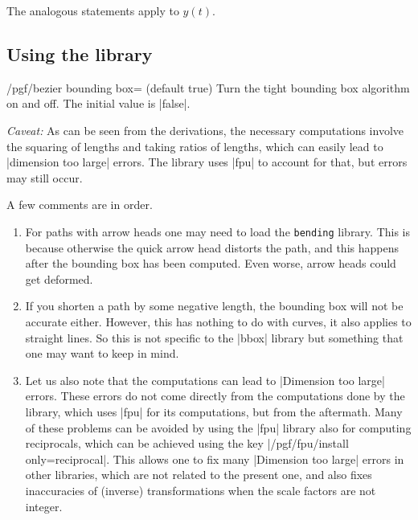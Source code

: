 The analogous statements apply to $y(t)$. 

\subsection{Using the library}

\begin{key}{/pgf/bezier bounding box= (default true)}
    Turn the tight bounding box algorithm on and off. The initial value is
	|false|.

	\emph{Caveat:} As can be seen from the derivations, the necessary
	computations involve the squaring of lengths and taking ratios of lengths,
	which can easily lead to |dimension too large| errors. The library uses
	|fpu| to account for that, but errors may still occur.
\end{key}


\begin{codeexample}[width=5cm]
\end{codeexample}

A few comments are in order. 
\begin{enumerate}
\item For paths with arrow heads one may need to load the \texttt{bending}
 library. This is because otherwise the quick arrow head distorts the path, and
 this happens after the bounding box has been computed. Even worse, arrow heads
 could get deformed.
\item If you shorten a path by some negative length, the bounding box will not
 be accurate either. However, this has nothing to do with curves, it also
 applies to straight lines. So this is not specific to the |bbox| library but
 something that one may want to keep in mind.
\item Let us also note that the computations can lead to |Dimension too large|
 errors. These errors do not come directly from the computations done by the
 library, which uses |fpu| for its computations, but from the aftermath. Many of
 these problems can be avoided by using the |fpu| library also for computing
 reciprocals, which can be achieved using the key 
 |/pgf/fpu/install only={reciprocal}|. This allows one to fix many 
 |Dimension too large| errors in  other libraries, which are not related to the
 present one, and also fixes inaccuracies of (inverse) transformations when the
 scale factors are not integer.
\end{enumerate}

